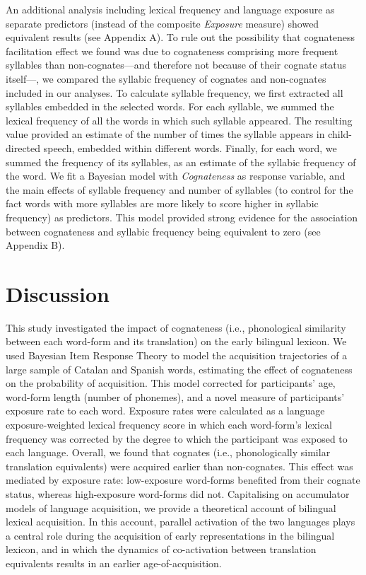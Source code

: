 \documentclass[
]{article}
\begin{document}
An additional analysis including lexical frequency and language exposure
as separate predictors (instead of the composite \emph{Exposure}
measure) showed equivalent results (see Appendix A). To rule out the
possibility that cognateness facilitation effect we found was due to
cognateness comprising more frequent syllables than non-cognates---and
therefore not because of their cognate status itself---, we compared the
syllabic frequency of cognates and non-cognates included in our
analyses. To calculate syllable frequency, we first extracted all
syllables embedded in the selected words. For each syllable, we summed
the lexical frequency of all the words in which such syllable appeared.
The resulting value provided an estimate of the number of times the
syllable appears in child-directed speech, embedded within different
words. Finally, for each word, we summed the frequency of its syllables,
as an estimate of the syllabic frequency of the word. We fit a Bayesian
model with \emph{Cognateness} as response variable, and the main effects
of syllable frequency and number of syllables (to control for the fact
words with more syllables are more likely to score higher in syllabic
frequency) as predictors. This model provided strong evidence for the
association between cognateness and syllabic frequency being equivalent
to zero (see Appendix B).

\hypertarget{sec-discussion}{%
\section{Discussion}\label{sec-discussion}}

This study investigated the impact of cognateness (i.e., phonological
similarity between each word-form and its translation) on the early
bilingual lexicon. We used Bayesian Item Response Theory to model the
acquisition trajectories of a large sample of Catalan and Spanish words,
estimating the effect of cognateness on the probability of acquisition.
This model corrected for participants' age, word-form length (number of
phonemes), and a novel measure of participants' exposure rate to each
word. Exposure rates were calculated as a language exposure-weighted
lexical frequency score in which each word-form's lexical frequency was
corrected by the degree to which the participant was exposed to each
language. Overall, we found that cognates (i.e., phonologically similar
translation equivalents) were acquired earlier than non-cognates. This
effect was mediated by exposure rate: low-exposure word-forms benefited
from their cognate status, whereas high-exposure word-forms did not.
Capitalising on accumulator models of language acquisition, we provide a
theoretical account of bilingual lexical acquisition. In this account,
parallel activation of the two languages plays a central role during the
acquisition of early representations in the bilingual lexicon, and in
which the dynamics of co-activation between translation equivalents
results in an earlier age-of-acquisition.
\end{document}

